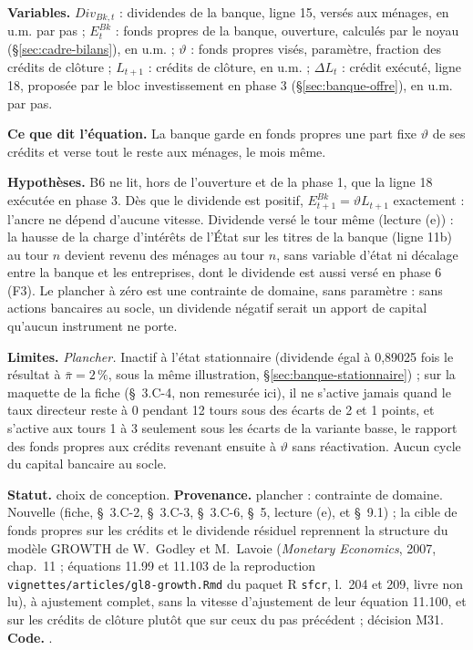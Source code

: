 \documentclass[11pt,a4paper]{article}
\newcommand{\variables}{\par\noindent\textbf{Variables.} }
\newcommand{\sens}{\par\noindent\textbf{Ce que dit l'équation.} }
\newcommand{\hyp}{\par\noindent\textbf{Hypothèses.} }
\newcommand{\limites}{\par\noindent\textbf{Limites.} }
\newcommand{\code}[1]{\texttt{\detokenize{#1}}}
\newcommand{\tracabilite}[3]{\par\smallskip\noindent\textbf{Statut.} #1. \textbf{Provenance.} #2. \textbf{Code.} \code{#3}.}
\newcommand{\barre}[1]{\leavevmode\sbox{\boitebarre}{#1}\rlap{\rule[0.6ex]{\wd\boitebarre}{0.4pt}}\usebox{\boitebarre}}
\begin{document}
\begin{proposee}
\begin{equation}
\end{equation}
\begin{lecture}
\variables $\mathit{Div}_{\mathit{Bk},t}$ : dividendes de la banque, ligne 15, versés aux ménages, en u.m. par pas ; $E^{\mathit{Bk}}_t$ : fonds propres de la banque, ouverture, calculés par le noyau (\S\ref{sec:cadre-bilans}), en u.m. ; $\vartheta$ : fonds propres visés, paramètre, fraction des crédits de clôture ; $L_{t+1}$ : crédits de clôture, en u.m. ; $\Delta L_t$ : crédit exécuté, ligne 18, proposée par le bloc investissement en phase 3 (\S\ref{sec:banque-offre}), en u.m. par pas.
\sens La banque garde en fonds propres une part fixe $\vartheta$ de ses crédits et verse tout le reste aux ménages, le mois même.
\hyp B6 ne lit, hors de l'ouverture et de la phase 1, que la ligne 18 exécutée en phase 3. Dès que le dividende est positif, $E^{\mathit{Bk}}_{t+1} = \vartheta L_{t+1}$ exactement : l'ancre ne dépend d'aucune vitesse. Dividende versé le tour même (lecture (e)) : la hausse de la charge d'intérêts de l'État sur les titres de la banque (ligne 11b) au tour $n$ devient revenu des ménages au tour $n$, sans variable d'état ni décalage entre la banque et les entreprises, dont le dividende est aussi versé en phase 6 (F3). Le plancher à zéro est une contrainte de domaine, sans paramètre : sans actions bancaires au socle, un dividende négatif serait un apport de capital qu'aucun instrument ne porte.
\limites \emph{Plancher.} Inactif à l'état stationnaire (dividende égal à 0,89025 fois le résultat à $\bar\pi = 2\,\%$, \barre{0,89262} sous la même illustration, \S\ref{sec:banque-stationnaire}) ; sur la maquette de la fiche (\S~3.C-4, non remesurée ici), il ne s'active jamais quand le taux directeur reste à 0 pendant 12 tours sous des écarts de 2 et 1 points, et s'active aux tours 1 à 3 seulement sous les écarts de la variante basse, le rapport des fonds propres aux crédits revenant ensuite à $\vartheta$ sans réactivation. Aucun cycle du capital bancaire au socle.
\tracabilite{choix de conception}{plancher : contrainte de domaine. Nouvelle (fiche, \S~3.C-2, \S~3.C-3, \S~3.C-6, \S~5, lecture (e), et \S~9.1) ; la cible de fonds propres sur les crédits et le dividende résiduel reprennent la structure du modèle GROWTH de W.~Godley et M.~Lavoie (\emph{Monetary Economics}, 2007, chap.~11 ; équations 11.99 et 11.103 de la reproduction \nolinkurl{vignettes/articles/gl8-growth.Rmd} du paquet R \texttt{sfcr}, l.~204 et 209, livre non lu), à ajustement complet, sans la vitesse d'ajustement de leur équation 11.100, et sur les crédits de clôture plutôt que sur ceux du pas précédent ; décision M31}{nations.blocs.banque.dividendes}
\end{lecture}
\end{proposee}
\end{document}
